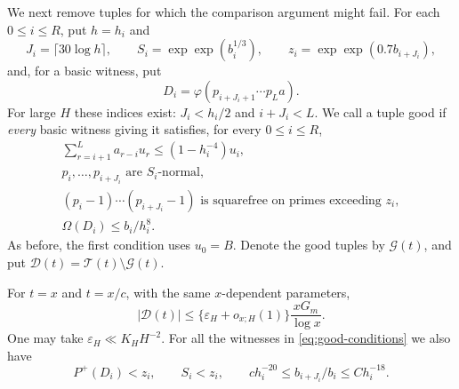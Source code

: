 We next remove tuples for which the comparison argument might fail.
For each \(0\le i\le R\), put \(h=h_i\) and
\[
 J_i=\lceil30\log h\rceil,\qquad
 S_i=\exp\exp(b_i^{1/3}),\qquad
 z_i=\exp\exp(0.7b_{i+J_i}),
\]
and, for a basic witness, put
\[
 D_i=\varphi(p_{i+J_i+1}\cdots p_La).
\]
For large \(H\) these indices exist:
\(J_i<h_i/2\) and \(i+J_i<L\).
We call a tuple good if \emph{every} basic witness giving it satisfies,
for every \(0\le i\le R\),
\begin{equation}\label{eq:good-conditions}
 \begin{gathered}
 \sum_{r=i+1}^L a_{r-i}u_r\le(1-h_i^{-4})u_i,\\
 p_i,\ldots,p_{i+J_i}\text{ are }S_i\text{-normal},\\
 (p_i-1)\cdots(p_{i+J_i}-1)
 \text{ is squarefree on primes exceeding }z_i,\\
 \Omega(D_i)\le b_i/h_i^8 .
 \end{gathered}
\end{equation}
As before, the first condition uses \(u_0=B\).
Denote the good tuples by \(\mathcal G(t)\), and put
\(\mathcal D(t)=\mathcal T(t)\setminus\mathcal G(t)\).

\begin{proposition}\label{prop:discard}
For \(t=x\) and \(t=x/c\), with the same \(x\)-dependent parameters,
\[
 |\mathcal D(t)|
 \le\{\varepsilon_H+o_{x;H}(1)\}\frac{xG_m}{\log x}.
\]
One may take \(\varepsilon_H\ll K_HH^{-2}\).
For all the witnesses in \eqref{eq:good-conditions} we also have
\begin{equation}\label{eq:tail-cutoffs}
 P^+(D_i)<z_i,\qquad S_i<z_i,\qquad
 c h_i^{-20}\le b_{i+J_i}/b_i\le C h_i^{-18}.
\end{equation}
\end{proposition}

